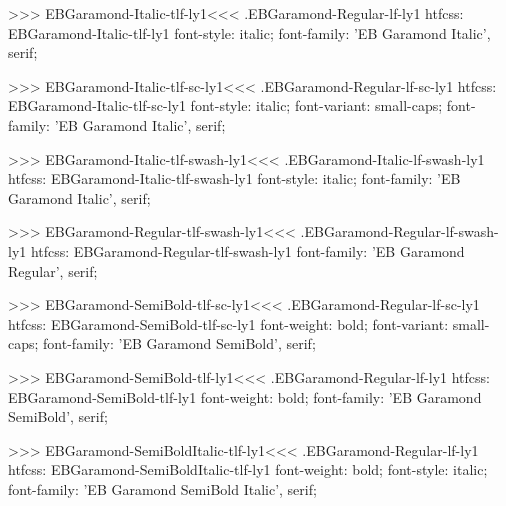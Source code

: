 {{>>>
\<EBGaramond-Italic-tlf-ly1\><<<
.EBGaramond-Regular-lf-ly1
htfcss:  EBGaramond-Italic-tlf-ly1  font-style: italic; font-family: 'EB Garamond Italic', serif;

>>>
\<EBGaramond-Italic-tlf-sc-ly1\><<<
.EBGaramond-Regular-lf-sc-ly1
htfcss:  EBGaramond-Italic-tlf-sc-ly1  font-style: italic; font-variant: small-caps; font-family: 'EB Garamond Italic', serif;

>>>
\<EBGaramond-Italic-tlf-swash-ly1\><<<
.EBGaramond-Italic-lf-swash-ly1
htfcss:  EBGaramond-Italic-tlf-swash-ly1  font-style: italic; font-family: 'EB Garamond Italic', serif;

>>>
\<EBGaramond-Regular-tlf-swash-ly1\><<<
.EBGaramond-Regular-lf-swash-ly1
htfcss:  EBGaramond-Regular-tlf-swash-ly1  font-family: 'EB Garamond Regular', serif;

>>>
\<EBGaramond-SemiBold-tlf-sc-ly1\><<<
.EBGaramond-Regular-lf-sc-ly1
htfcss:  EBGaramond-SemiBold-tlf-sc-ly1  font-weight: bold; font-variant: small-caps; font-family: 'EB Garamond SemiBold', serif;

>>>
\<EBGaramond-SemiBold-tlf-ly1\><<<
.EBGaramond-Regular-lf-ly1
htfcss:  EBGaramond-SemiBold-tlf-ly1  font-weight: bold; font-family: 'EB Garamond SemiBold', serif;

>>>
\<EBGaramond-SemiBoldItalic-tlf-ly1\><<<
.EBGaramond-Regular-lf-ly1
htfcss:  EBGaramond-SemiBoldItalic-tlf-ly1  font-weight: bold; font-style: italic; font-family: 'EB Garamond SemiBold Italic', serif;

}}
